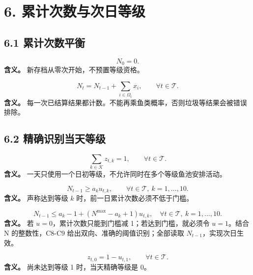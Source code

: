 \documentclass[11pt,a4paper]{article}
\begin{document}
\section*{\color{modelblue}6. 累计次数与次日等级}

\subsection*{6.1 累计次数平衡}

\begin{samepage}
\[
N_0=0. \tag{C5}
\]
\textbf{含义。} 新存档从零次开始，不预置等级资格。\par
\end{samepage}

\begin{samepage}
\[
N_t=N_{t-1}+\sum_{i\in\Omega_t}x_i,\qquad \forall t\in\mathcal T. \tag{C6}
\]
\textbf{含义。} 每一次已结算结果都计数。不能再乘鱼类概率，否则垃圾等结果会被错误排除。\par
\end{samepage}

\subsection*{6.2 精确识别当天等级}

\begin{samepage}
\[
\sum_{k\in\mathcal K}z_{t,k}=1,\qquad \forall t\in\mathcal T. \tag{C7}
\]
\textbf{含义。} 一天只使用一个日初等级，不允许同时在多个等级鱼池安排活动。\par
\end{samepage}

\begin{samepage}
\[
N_{t-1}\ge a_ku_{t,k},\qquad \forall t\in\mathcal T,\ k=1,\ldots,10. \tag{C8}
\]
\textbf{含义。} 声称达到等级 $k$ 时，前一日累计次数必须不低于门槛。\par
\end{samepage}

\begin{samepage}
\[
N_{t-1}\le a_k-1+(N^{\max}-a_k+1)u_{t,k},
\quad \forall t\in\mathcal T,\ k=1,\ldots,10. \tag{C9}
\]
\textbf{含义。} 若 $u=0$，累计次数只能到门槛减 1；若达到门槛，就必须令 $u=1$。结合 N 的整数性，C8-C9 给出双向、准确的阈值识别；全部读取 $N_{t-1}$，实现次日生效。\par
\end{samepage}

\begin{samepage}
\[
z_{t,0}=1-u_{t,1},\qquad \forall t\in\mathcal T. \tag{C10}
\]
\textbf{含义。} 尚未达到等级 1 时，当天精确等级是 0。\par
\end{samepage}
\end{document}
